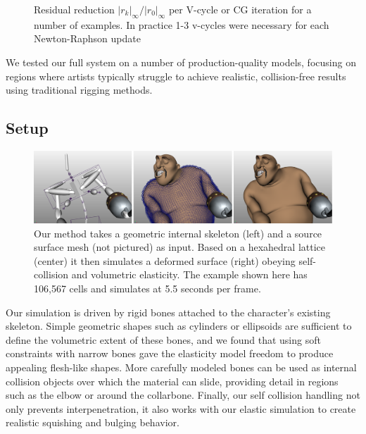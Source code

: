 \begin{figure}[tb]
\caption[Residual reduction $|r_k|_{\infty}/|r_0|_{\infty}$ per
  V-cycle or CG iteration for a number of examples.]{Residual reduction $|r_k|_{\infty}/|r_0|_{\infty}$ per
  V-cycle or CG iteration for a number of examples. In practice 1-3 v-cycles were necessary for each  Newton-Raphson update}
\label{fig:cube_convergence}
\end{figure}


We tested our full system on a number of production-quality models, focusing on regions where artists typically struggle to achieve realistic, collision-free results using traditional rigging methods.  

\subsection{Setup}
\begin{figure}[tb]
\includegraphics[width=\linewidth]{elasticity/figures/teaser3}
 \caption[The setup procedure for our method.]{Our method takes a geometric internal skeleton (left) and a source
   surface mesh (not pictured) as input. Based on a hexahedral lattice (center)
   it then simulates a deformed surface (right) obeying self-collision and volumetric
   elasticity. The example shown here has 106,567 cells and simulates at 5.5
   seconds per frame.}\label{fig:teaser}
\end{figure}
Our simulation is driven by rigid bones attached to the character's existing skeleton.  Simple geometric shapes such as cylinders or ellipsoids are sufficient to define the volumetric extent of these bones, and we found that using soft constraints with narrow bones gave the elasticity model freedom to produce appealing flesh-like shapes. More carefully modeled bones can be used as internal collision objects over which the material can slide, providing detail in regions such as the elbow or around the collarbone. Finally, our self collision handling not only prevents interpenetration, it also works with our elastic simulation to create realistic squishing and bulging behavior.  

